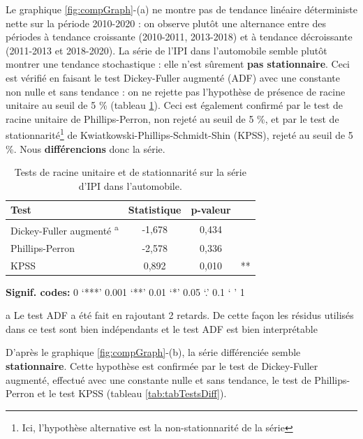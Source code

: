\documentclass[french]{article}
\begin{document}
Le graphique \ref{fig:compGraph}-(a) ne montre pas de tendance linéaire déterministe nette sur la période 2010-2020 : on observe plutôt une alternance entre des périodes à tendance croissante (2010-2011, 2013-2018) et à tendance décroissante (2011-2013 et 2018-2020).
La série de l'IPI dans l'automobile semble plutôt montrer une tendance stochastique : elle n'est sûrement \textbf{pas stationnaire}. Ceci est vérifié en faisant le test Dickey-Fuller augmenté (ADF) avec une constante non nulle et sans tendance : on ne rejette pas l'hypothèse de présence de racine unitaire au seuil de 5 \% (tableau \ref{tab:tabTestsInit}).
Ceci est également confirmé par le test de racine unitaire de Phillips-Perron, non rejeté au seuil de 5 \%, et par le test de stationnarité\footnote{Ici, l'hypothèse alternative est la non-stationnarité de la série} de Kwiatkowski-Phillips-Schmidt-Shin (KPSS), rejeté au seuil de 5 \%. Nous \textbf{différencions} donc la série.

\begin{table}[!h]

\caption{\label{tab:tabTestsInit}Tests de racine unitaire et de stationnarité sur la série d'IPI dans l'automobile.}
\centering
\begin{threeparttable}
\begin{tabular}[t]{lccc}
\toprule
Test & Statistique & p-valeur & \\
\midrule
Dickey-Fuller augmenté \textsuperscript{a} & -1,678 & 0,434 & \\
Phillips-Perron & -2,578 & 0,336 & \\
KPSS & 0,892 & 0,010 & **\\
\bottomrule
\end{tabular}
\begin{tablenotes}
\item \hspace{-0.4cm}\textbf{Signif. codes: }0 `***' 0.001 `**' 0.01 `*' 0.05 `.' 0.1 ` ' 1
\item[a] Le test ADF a été fait en rajoutant 2 retards. De cette façon les résidus utilisés dans ce test sont bien indépendants et le test ADF est bien interprétable
\end{tablenotes}
\end{threeparttable}
\end{table}

D'après le graphique \ref{fig:compGraph}-(b), la série différenciée semble \textbf{stationnaire}.
Cette hypothèse est confirmée par le test de Dickey-Fuller augmenté, effectué avec une constante nulle et sans tendance, le test de Phillips-Perron et le test KPSS (tableau \ref{tab:tabTestsDiff}).
\end{document}

